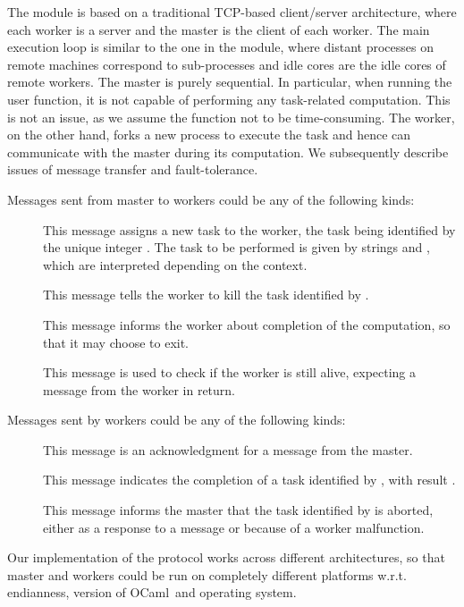 \documentclass{llncs}
\newcommand{\Ocaml}{OCaml}
\begin{document}
The  module is based on a traditional TCP-based client/server
architecture, where each worker is a server and the master is the
client of each worker. The main execution loop is similar to the one
in the  module, where distant processes on remote machines
correspond to sub-processes and idle cores are the idle cores 
of remote workers. 
The master is purely sequential. In particular, when running the user
 function, it is not capable of performing any task-related
computation. This is not an issue, as we assume the 
function not to be time-consuming.
The worker, on the other hand, forks a new process to execute the task
and hence can communicate with the master during its computation.
We subsequently describe issues of message
transfer and fault-tolerance.


Messages sent from master to workers could be any of the following kinds:
\begin{description}
\item[] This message assigns a
  new task to the worker, the task being identified by the unique
  integer . The task to be performed is given by strings 
  and , which are interpreted depending on the context.

\item[] This message tells the worker to kill the task
  identified by .

\item[] This message informs the worker about completion of
  the computation, so that it may choose to exit.

\item[] This message is used to check if the worker is still
  alive, expecting a  message from the worker in return.
\end{description}
Messages sent by workers could be any of the following kinds:
\begin{description}
\item[] This message is an acknowledgment for a 
  message from the master.

\item[] This message indicates the
  completion of a task identified by , with result .

\item[] This message informs the master that the
  task identified by  is aborted, either as a response to a
   message or because of a worker malfunction.
\end{description}
Our implementation of the protocol works across different
architectures, so that master and workers could be run on completely
different platforms w.r.t. endianness, version of \Ocaml\ and
operating system.
\end{document}
